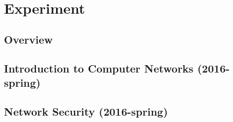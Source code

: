 \chapter{Experiment}\label{cha:Experiment}

\section{Overview}

\section{Introduction to Computer Networks (2016-spring)}

\section{Network Security (2016-spring)}
